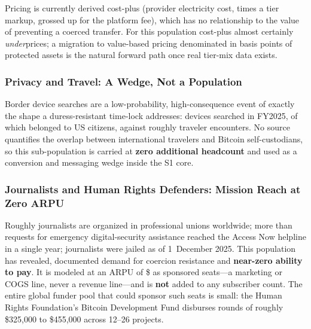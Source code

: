 \noindent Pricing is currently derived cost-plus (provider electricity cost, times a
tier markup, grossed up for the platform fee), which has no relationship to the value
of preventing a coerced transfer. For this population cost-plus almost certainly
\emph{under}prices; a migration to value-based pricing denominated in basis points of
protected assets is the natural forward path once real tier-mix data exists.

\subsubsection*{Privacy and Travel: A Wedge, Not a Population}

Border device searches are a low-probability, high-consequence event of exactly the
shape a duress-resistant time-lock addresses:  devices searched in
FY2025, of which  belonged to US citizens\cite{cbp2025searches}, against
roughly  traveler encounters. No source quantifies the overlap
between international travelers and Bitcoin self-custodians, so this sub-population
is carried at \textbf{zero additional headcount} and used as a conversion and
messaging wedge inside the S1 core.


\subsubsection*{Journalists and Human Rights Defenders: Mission Reach at Zero ARPU}

Roughly \numint{\segOneMissionReachJournalists} journalists are organized in
professional unions worldwide\cite{ifj2026}; more than  requests for
emergency digital-security assistance reached the Access Now helpline in a single
year\cite{accessnow2025helpline};  journalists were jailed as of
1~December 2025\cite{cpj2026census}. This population has revealed, documented demand
for coercion resistance and \textbf{near-zero ability to pay}. It is modeled at an
ARPU of \$\numint{\arpuSegOneMissionMonthly} as sponsored seats---a marketing or COGS
line, never a revenue line---and is \textbf{not} added to any subscriber count. The
entire global funder pool that could sponsor such seats is small: the Human Rights
Foundation's Bitcoin Development Fund disburses rounds of roughly \$325{,}000 to
\$455{,}000 across 12--26 projects\cite{hrf2025bdf}.

